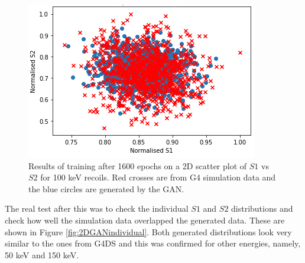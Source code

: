 \documentclass[11pt]{article} %
\begin{document}
\begin{figure}[H]
\centering
\includegraphics[scale=0.7]{images/2d_s1_s2_1600.png}
\caption{Results of training after 1600 epochs on a 2D scatter plot of $S1$ vs $S2$ for 100 keV recoils. Red crosses are from G4 simulation data  and the blue circles are generated by the GAN.}
\label{fig:2DGAN}
\end{figure}

The real test after this was to check the individual $S1$ and $S2$ distributions and check how well the simulation data overlapped the generated data. These are shown in Figure \ref{fig:2DGANindividual}. Both generated distributions look very similar to the ones from G4DS and this was confirmed for other energies, namely, 50 keV and 150 keV.
\end{document}
